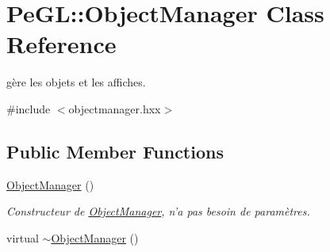 \hypertarget{classPeGL_1_1ObjectManager}{\section{Pe\-G\-L\-:\-:Object\-Manager Class Reference}
\label{classPeGL_1_1ObjectManager}
}


gère les objets et les affiches.  




{\ttfamily \#include $<$objectmanager.\-hxx$>$}

\subsection*{Public Member Functions}
\begin{DoxyCompactItemize}
\item 
\hypertarget{classPeGL_1_1ObjectManager_aa1d9d5c3602f8e6f7a584e7d74e2d2ce}{\hyperlink{classPeGL_1_1ObjectManager_aa1d9d5c3602f8e6f7a584e7d74e2d2ce}{Object\-Manager} ()}\label{classPeGL_1_1ObjectManager_aa1d9d5c3602f8e6f7a584e7d74e2d2ce}

\begin{DoxyCompactList}\small\item\em Constructeur de \hyperlink{classPeGL_1_1ObjectManager}{Object\-Manager}, n'a pas besoin de paramètres. \end{DoxyCompactList}\item 
\hypertarget{classPeGL_1_1ObjectManager_ad0afbf963fddb7b7c77f516aba1c6e86}{virtual \hyperlink{classPeGL_1_1ObjectManager_ad0afbf963fddb7b7c77f516aba1c6e86}{$\sim$\-Object\-Manager} ()}\label{classPeGL_1_1ObjectManager_ad0afbf963fddb7b7c77f516aba1c6e86}


\end{DoxyCompactItemize}
